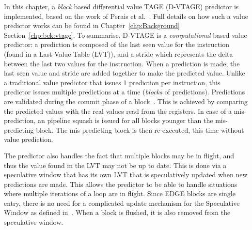 In this chapter, a \textit{block} based differential value TAGE (D-VTAGE) predictor is implemented, based on the work of Perais et al.~\cite{peraisBeBop2015}.
Full details on how such a value predictor works can be found in Chapter~\ref{chp:Background} Section~\ref{chp:bck:vtage}.
To summarise, D-VTAGE is a \textit{computational} based value predictor: a prediction is composed of the last seen value for the instruction (found in a Last Value Table (LVT)), and a stride which represents the delta between the last two values for the instruction.
When a prediction is made, the last seen value and stride are added together to make the predicted value.
Unlike a traditional value predictor that issues 1 prediction per instruction, this predictor issues multiple predictions at a time (\textit{blocks} of predictions).
Predictions are validated during the commit phase of a block~\cite{peraisVTAGE2014}.
This is achieved by comparing the predicted values with the real values read from the registers.
In case of a mis-prediction, an pipeline squash is issued for all blocks younger than the mis-predicting block.
The mis-predicting block is then re-executed, this time without value prediction.

The predictor also handles the fact that multiple blocks may be in flight, and thus the value found in the LVT may not be up to date.
This is done via a speculative window that has its own LVT that is speculatively updated when new predictions are made.
This allows the predictor to be able to handle situations where multiple iterations of a loop are in flight.
Since EDGE blocks are single entry, there is no need for a complicated update mechanism for the Speculative Window as defined in~\cite{peraisBeBop2015}.
When a block is flushed, it is also removed from the speculative window.





